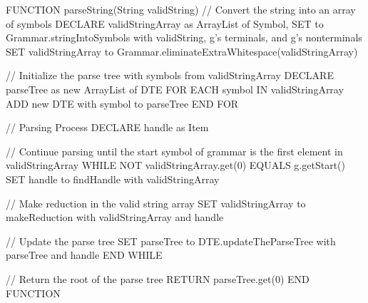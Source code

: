 \vspace{10pt}

\begin{codeblock}
    FUNCTION parseString(String validString)
    // Convert the string into an array of symbols
    DECLARE validStringArray as ArrayList of Symbol, SET to Grammar.stringIntoSymbols with validString, g's terminals, and g's nonterminals
    SET validStringArray to Grammar.eliminateExtraWhitespace(validStringArray)

    // Initialize the parse tree with symbols from validStringArray
    DECLARE parseTree as new ArrayList of DTE
    FOR EACH symbol IN validStringArray
    ADD new DTE with symbol to parseTree
    END FOR

    // Parsing Process
    DECLARE handle as Item

    // Continue parsing until the start symbol of grammar is the first element in validStringArray
    WHILE NOT validStringArray.get(0) EQUALS g.getStart()
    SET handle to findHandle with validStringArray

    // Make reduction in the valid string array
    SET validStringArray to makeReduction with validStringArray and handle

    // Update the parse tree
    SET parseTree to DTE.updateTheParseTree with parseTree and handle
    END WHILE

    // Return the root of the parse tree
    RETURN parseTree.get(0)
    END FUNCTION

\end{codeblock}